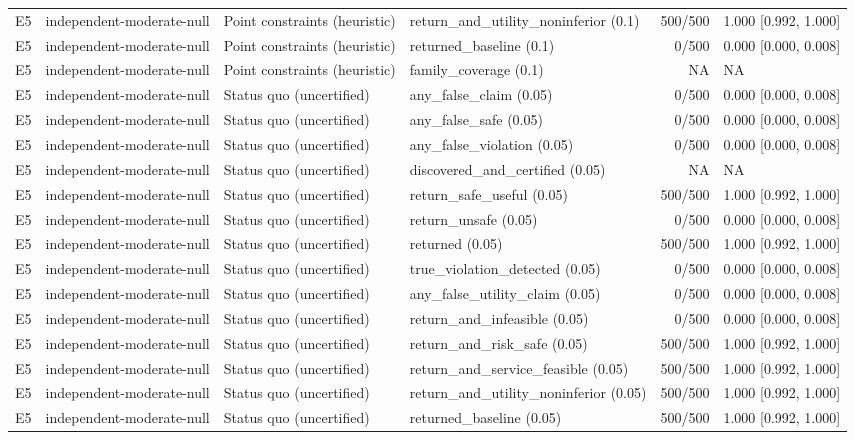 \begin{longtable}{p{.04\linewidth}p{.18\linewidth}p{.19\linewidth}p{.16\linewidth}r p{.21\linewidth}}
E5 & independent-moderate-null & Point constraints (heuristic) & return\_and\_utility\_noninferior (0.1) & 500/500 & 1.000 [0.992, 1.000]\\
E5 & independent-moderate-null & Point constraints (heuristic) & returned\_baseline (0.1) & 0/500 & 0.000 [0.000, 0.008]\\
E5 & independent-moderate-null & Point constraints (heuristic) & family\_coverage (0.1) & NA & NA\\
E5 & independent-moderate-null & Status quo (uncertified) & any\_false\_claim (0.05) & 0/500 & 0.000 [0.000, 0.008]\\
E5 & independent-moderate-null & Status quo (uncertified) & any\_false\_safe (0.05) & 0/500 & 0.000 [0.000, 0.008]\\
E5 & independent-moderate-null & Status quo (uncertified) & any\_false\_violation (0.05) & 0/500 & 0.000 [0.000, 0.008]\\
E5 & independent-moderate-null & Status quo (uncertified) & discovered\_and\_certified (0.05) & NA & NA\\
E5 & independent-moderate-null & Status quo (uncertified) & return\_safe\_useful (0.05) & 500/500 & 1.000 [0.992, 1.000]\\
E5 & independent-moderate-null & Status quo (uncertified) & return\_unsafe (0.05) & 0/500 & 0.000 [0.000, 0.008]\\
E5 & independent-moderate-null & Status quo (uncertified) & returned (0.05) & 500/500 & 1.000 [0.992, 1.000]\\
E5 & independent-moderate-null & Status quo (uncertified) & true\_violation\_detected (0.05) & 0/500 & 0.000 [0.000, 0.008]\\
E5 & independent-moderate-null & Status quo (uncertified) & any\_false\_utility\_claim (0.05) & 0/500 & 0.000 [0.000, 0.008]\\
E5 & independent-moderate-null & Status quo (uncertified) & return\_and\_infeasible (0.05) & 0/500 & 0.000 [0.000, 0.008]\\
E5 & independent-moderate-null & Status quo (uncertified) & return\_and\_risk\_safe (0.05) & 500/500 & 1.000 [0.992, 1.000]\\
E5 & independent-moderate-null & Status quo (uncertified) & return\_and\_service\_feasible (0.05) & 500/500 & 1.000 [0.992, 1.000]\\
E5 & independent-moderate-null & Status quo (uncertified) & return\_and\_utility\_noninferior (0.05) & 500/500 & 1.000 [0.992, 1.000]\\
E5 & independent-moderate-null & Status quo (uncertified) & returned\_baseline (0.05) & 500/500 & 1.000 [0.992, 1.000]\\

\end{longtable}
